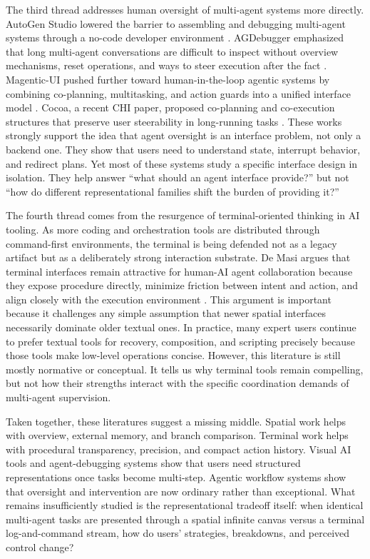\documentclass[sigconf]{acmart}
\begin{document}
The third thread addresses human oversight of multi-agent systems more directly. AutoGen Studio lowered the barrier to assembling and debugging multi-agent systems through a no-code developer environment \cite{dibia2024autogen}. AGDebugger emphasized that long multi-agent conversations are difficult to inspect without overview mechanisms, reset operations, and ways to steer execution after the fact \cite{epperson2025agdebugger}. Magentic-UI pushed further toward human-in-the-loop agentic systems by combining co-planning, multitasking, and action guards into a unified interface model \cite{mozannar2025magenticui}. Cocoa, a recent CHI paper, proposed co-planning and co-execution structures that preserve user steerability in long-running tasks \cite{feng2026cocoa}. These works strongly support the idea that agent oversight is an interface problem, not only a backend one. They show that users need to understand state, interrupt behavior, and redirect plans. Yet most of these systems study a specific interface design in isolation. They help answer ``what should an agent interface provide?'' but not ``how do different representational families shift the burden of providing it?''

The fourth thread comes from the resurgence of terminal-oriented thinking in AI tooling. As more coding and orchestration tools are distributed through command-first environments, the terminal is being defended not as a legacy artifact but as a deliberately strong interaction substrate. De Masi argues that terminal interfaces remain attractive for human-AI agent collaboration because they expose procedure directly, minimize friction between intent and action, and align closely with the execution environment \cite{demasi2026terminal}. This argument is important because it challenges any simple assumption that newer spatial interfaces necessarily dominate older textual ones. In practice, many expert users continue to prefer textual tools for recovery, composition, and scripting precisely because those tools make low-level operations concise. However, this literature is still mostly normative or conceptual. It tells us why terminal tools remain compelling, but not how their strengths interact with the specific coordination demands of multi-agent supervision.

Taken together, these literatures suggest a missing middle. Spatial work helps with overview, external memory, and branch comparison. Terminal work helps with procedural transparency, precision, and compact action history. Visual AI tools and agent-debugging systems show that users need structured representations once tasks become multi-step. Agentic workflow systems show that oversight and intervention are now ordinary rather than exceptional. What remains insufficiently studied is the representational tradeoff itself: when identical multi-agent tasks are presented through a spatial infinite canvas versus a terminal log-and-command stream, how do users' strategies, breakdowns, and perceived control change?
\end{document}
